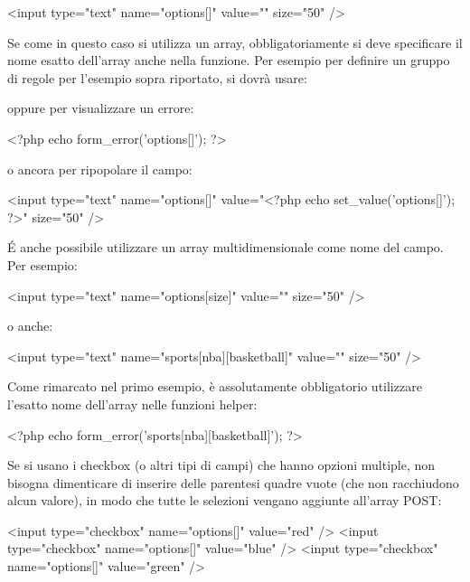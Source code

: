 \begin{code}
<input type="text" name="options[]" value="" size="50" />
\end{code}

Se come in questo caso si utilizza un array, obbligatoriamente si deve specificare il nome esatto dell'array anche nella funzione. Per esempio per definire un gruppo di regole per l'esempio sopra riportato, si dovrà usare:


oppure per visualizzare un errore:

\begin{code}
<?php echo form_error('options[]'); ?>
\end{code}

o ancora per ripopolare il campo:

\begin{code}
<input type="text" name="options[]" value="<?php echo set_value('options[]'); ?>" size="50" />
\end{code}

\'E anche possibile utilizzare un array multidimensionale come nome del campo. Per esempio:

\begin{code}
<input type="text" name="options[size]" value="" size="50" />
\end{code}

o anche:

\begin{code}
<input type="text" name="sports[nba][basketball]" value="" size="50" />
\end{code}

Come rimarcato nel primo esempio, è assolutamente obbligatorio utilizzare l'esatto nome dell'array nelle funzioni helper:

\begin{code}
<?php echo form_error('sports[nba][basketball]'); ?>
\end{code}

Se si usano i checkbox (o altri tipi di campi) che hanno opzioni multiple, non bisogna dimenticare di inserire delle parentesi quadre vuote (che non racchiudono alcun valore), in modo che tutte le selezioni vengano aggiunte all'array POST:

\begin{code}
<input type="checkbox" name="options[]" value="red" />
<input type="checkbox" name="options[]" value="blue" />
<input type="checkbox" name="options[]" value="green" />
\end{code}

